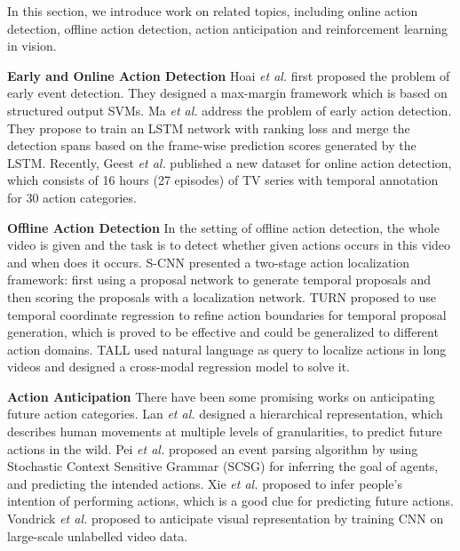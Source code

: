 \documentclass{bmvc2k}
\begin{document}
In this section, we introduce work on related topics, including online action detection, offline action detection, action anticipation and reinforcement learning in vision. 

\textbf{Early and Online Action Detection}
Hoai \emph{et al.} \cite{hoai2012max, hoai2014max} first proposed the problem of early event detection. They designed a max-margin framework which is based on structured output SVMs. Ma \emph{et al.} \cite{Ma_2016_CVPR}  address the problem of early action detection. They propose to train an LSTM network with ranking loss and merge the detection spans based on the frame-wise prediction scores generated by the LSTM. Recently, Geest \emph{et al.} \cite{de2016online} published a new dataset for online action detection, which consists of 16 hours (27 episodes) of TV series with temporal annotation for 30 action categories. 

\textbf{Offline Action Detection}
In the setting of offline action detection, the whole video is given and the task is to detect whether given actions occurs in this video and when does it occurs.  S-CNN \cite{Shou_2016_CVPR} presented a two-stage action localization framework: first using a proposal network to generate temporal proposals and then scoring the proposals with a localization network. TURN \cite{gao2017turn} proposed to use temporal coordinate regression to refine action boundaries for temporal proposal generation, which is proved to be effective and could be generalized to different action domains. TALL \cite{gao2017tall} used natural language as query to localize actions in long videos and designed a cross-modal regression model to solve it.



\textbf{Action Anticipation}
There have been some promising works on anticipating future action categories. Lan \emph{et al.} \cite{lan2014hierarchical} designed a hierarchical representation, which describes human movements at multiple levels of granularities, to predict future actions in the wild. Pei \emph{et al.} \cite{pei2011parsing} proposed an event parsing algorithm by using Stochastic Context Sensitive Grammar (SCSG) for inferring the goal of agents, and predicting the intended actions. Xie \emph{et al.} \cite{xie2013inferring} proposed to infer people's intention of performing actions, which is a good clue for predicting future actions. Vondrick \emph{et al.} \cite{vondrick2016anticipating} proposed to anticipate visual representation by training CNN on large-scale unlabelled video data.
\end{document}
